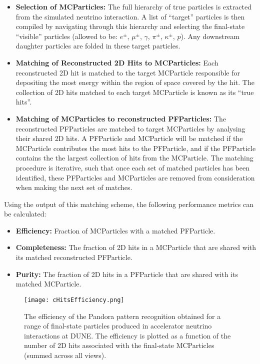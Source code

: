 \begin{itemize}
\item {\bf Selection of MCParticles:} The full hierarchy of true particles is extracted from the simulated neutrino interaction. A list of ``target'' particles is then compiled by navigating through this hierarchy and selecting the final-state ``visible'' particles (allowed to be: $e^{\pm}$, $\mu^{\pm}$, $\gamma$, $\pi^{\pm}$, $\kappa^{\pm}$, $p$). Any downstream daughter particles are folded in these target particles.
\item {\bf Matching of Reconstructed 2D Hits to MCParticles:} Each reconstructed 2D hit is matched to the target MCParticle responsible for depositing the most energy within the region of space covered by the hit. The collection of 2D hits matched to each target MCParticle is known as its ``true hits''.
\item {\bf Matching of MCParticles to reconstructed PFParticles:} The reconstructed PFParticles are matched to target MCParticles by analysing their shared 2D hits. A PFParticle and MCParticle will be matched if the MCParticle contributes the most hits to the PFParticle, and if the PFParticle contains the the largest collection of hits from the MCParticle. The matching procedure is iterative, such that once each set of matched particles has been identified, these PFParticles and MCParticles are removed from consideration when making the next set of matches. 
\end{itemize}

Using the output of this matching scheme, the following performance metrics can be calculated:

\begin{itemize}
\item{\bf Efficiency:} Fraction of MCParticles with a matched PFParticle.
\item{\bf Completeness:} The fraction of 2D hits in a MCParticle that are shared with its matched reconstructed PFParticle.
\item{\bf Purity:} The fraction of 2D hits in a PFParticle that are shared with its matched MCParticle.
\end{itemize}

\begin{figure}[!ht]
\centering
\texttt{[image: cHitsEfficiency.png]}
\caption{The efficiency of the Pandora pattern recognition obtained for a range of final-state particles produced in accelerator neutrino interactions at DUNE. The efficiency is plotted as a function of the number of 2D hits associated with the final-state MCParticles (summed across all views). }
\label{pandora_particle_efficiency}
\end{figure}


